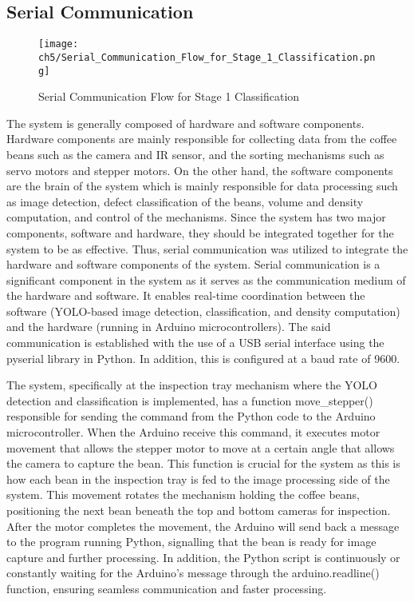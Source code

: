 \subsection{Serial Communication}
\label{sec:serial_communication}
\begin{figure}[H]
    \centering
    \texttt{[image: ch5/Serial\_Communication\_Flow\_for\_Stage\_1\_Classification.png]}
    \caption{Serial Communication Flow for Stage 1 Classification}
    \label{fig:serial_comm_flow}
\end{figure}
The system is generally composed of hardware and software components. Hardware components are mainly responsible for collecting data from the coffee beans such as the camera and IR sensor, and the sorting mechanisms such as servo motors and stepper motors. On the other hand, the software components are the brain of the system which is mainly responsible for data processing such as image detection, defect classification of the beans, volume and density computation, and control of the mechanisms. Since the system has two major components, software and hardware, they should be integrated together for the system to be as effective. Thus, serial communication was utilized to integrate the hardware and software components of the system. Serial communication is a significant component in the system as it serves as the communication medium of the hardware and software. It enables real-time coordination between the software (YOLO-based image detection, classification, and density computation) and the hardware (running in Arduino microcontrollers). The said communication is established with the use of a USB serial interface using the pyserial library in Python. In addition, this is configured at a baud rate of 9600.

The system, specifically at the inspection tray mechanism where the YOLO detection and classification is implemented, has a function move\_stepper() responsible for sending the command from the Python code to the Arduino microcontroller. When the Arduino receive this command, it executes motor movement that allows the stepper motor to move at a certain angle that allows the camera to capture the bean. This function is crucial for the system as this is how each bean in the inspection tray is fed to the image processing side of the system. This movement rotates the mechanism holding the coffee beans, positioning the next bean beneath the top and bottom cameras for inspection. After the motor completes the movement, the Arduino will send back a message to the program running Python, signalling that the bean is ready for image capture and further processing. In addition, the Python script is continuously or constantly waiting for the Arduino’s message through the arduino.readline() function, ensuring seamless communication and faster processing. 


